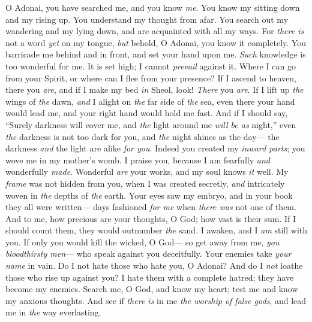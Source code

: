 \begin{biblechapter} %
 O Adonai, you have searched me, and you know \textit{me}.
\verse You know my sitting down and my rising up. 
You understand my thought from afar.
\verse You search out my wandering and my lying down, 
and are acquainted with all my ways.
\verse For \textit{there is} not a word \textit{yet} on my tongue, 
\textit{but} behold, O Adonai, you know it completely.
\verse You barricade me behind and in front, 
and set your hand upon me.
\verse \textit{Such} knowledge is too wonderful for me. 
It is set high; I cannot \textit{prevail} against it.
\verse Where I can go from your Spirit, 
or where can I flee from your presence?
\verse If I ascend to heaven, there you \textit{are}, 
and if I make my bed \textit{in} Sheol, look! \textit{There} you \textit{are}.
\verse If I lift up \textit{the} wings of \textit{the} dawn, 
\textit{and} I alight on \textit{the} far side of \textit{the} sea,
\verse even there your hand would lead me, 
and your right hand would hold me fast.
\verse And if I should say, “Surely darkness will cover me, 
and \textit{the} light around me \textit{will be as} night,”
\verse even \textit{the} darkness is not too dark for you, 
and \textit{the} night shines as the day— 
the darkness \textit{and} the light are alike \textit{for you}.
\verse Indeed you created my \textit{inward parts}; 
you wove me in my mother’s womb.
\verse I praise you, because I am fearfully 
\textit{and} wonderfully \textit{made}. 
Wonderful \textit{are} your works, 
and my soul knows \textit{it} well.
\verse My \textit{frame} was not hidden from you, 
when I was created secretly, 
\textit{and} intricately woven 
in \textit{the} depths of \textit{the} earth.
\verse Your eyes saw my embryo, 
and in your book they all were written— 
days fashioned \textit{for me} when \textit{there was} not one of them.
\verse And to me, how precious are your thoughts, O God; 
how vast is their sum.
\verse If I should count them, 
they would outnumber \textit{the} sand. 
I awaken, and I \textit{am} still with you.
\verse If only you would kill the wicked, O God— 
so get away from me, \textit{you} \textit{bloodthirsty men}—
\verse who speak against you deceitfully. 
Your enemies take \textit{your name} in vain.
\verse Do I not hate those who hate you, O Adonai? 
And do I \textit{not} loathe those who rise up against you?
\verse I hate them with a complete hatred; 
they have become my enemies.
\verse Search me, O God, and know my heart; 
test me and know my anxious thoughts.
\verse And see if \textit{there is} in me \textit{the worship of false gods}, 
and lead me in \textit{the} way everlasting.
\end{biblechapter}

